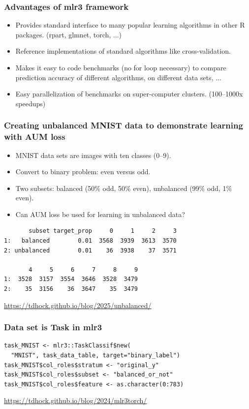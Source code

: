 \documentclass{beamer}
\begin{document}
\begin{frame}
  \frametitle{Advantages of mlr3 framework}
  \begin{itemize}
  \item Provides standard interface to many popular learning
    algorithms in other R packages. (rpart, glmnet, torch, ...)
  \item Reference implementations of standard algorithms like
    cross-validation.
  \item Makes it easy to code benchmarks  (no for loop necessary) to
    compare prediction accuracy of different algorithms, on different
    data sets, ...
  \item Easy parallelization of benchmarks on super-computer
    clusters. (100--1000x speedups)
  \end{itemize}
\end{frame}

\begin{frame}[fragile]
  \frametitle{Creating unbalanced MNIST data to demonstrate learning with AUM loss}
  \begin{itemize}
  \item MNIST data sets are images with ten classes (0--9).
  \item Convert to binary problem: even versus odd.
  \item Two subsets: balanced (50\% odd, 50\% even), unbalanced (99\%
    odd, 1\% even).
  \item Can AUM loss be used for learning in unbalanced data?
  \end{itemize}
\begin{verbatim}
       subset target_prop     0     1     2     3
1:   balanced        0.01  3568  3939  3613  3570
2: unbalanced        0.01    36  3938    37  3571

       4     5     6     7     8     9
1:  3528  3157  3554  3646  3528  3479
2:    35  3156    36  3647    35  3479
\end{verbatim}
  \url{https://tdhock.github.io/blog/2025/unbalanced/}
\end{frame}

\begin{frame}[fragile]
  \frametitle{Data set is Task in mlr3}
\begin{verbatim}
task_MNIST <- mlr3::TaskClassif$new(
  "MNIST", task_data_table, target="binary_label")
task_MNIST$col_roles$stratum <- "original_y"
task_MNIST$col_roles$subset <- "balanced_or_not"
task_MNIST$col_roles$feature <- as.character(0:783)
\end{verbatim}
  \url{https://tdhock.github.io/blog/2024/mlr3torch/}
\end{frame}
\end{document}
